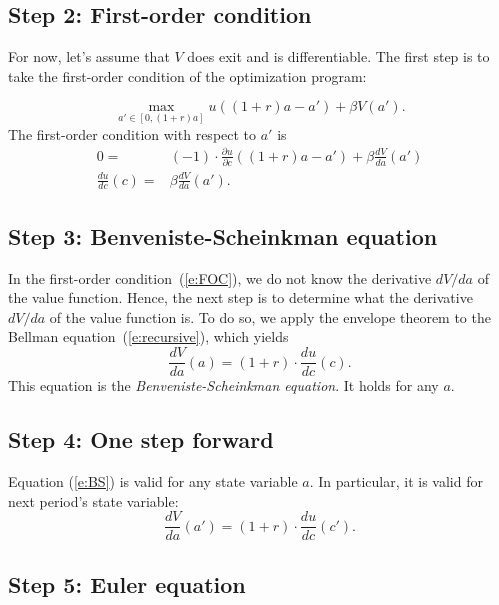 \documentclass{article}
\begin{document}
\subsection{Step 2: First-order condition}

For now, let's assume that $V$ does exit and is differentiable. The first step is to take the first-order condition of the optimization program:

\[
\max_{a'\in[0,(1+r) a]} u((1+r) a-a')+\beta V(a').
\]
The first-order condition with respect to $a'$ is
\wcSpan*[id=equation-10]{}
\setcounter{tpequation}{9}\label{e:FOC}
\[
\begin{align*}
0 = &(-1)\cdot \frac{\partial u}{\partial c}((1+r) a-a')+\beta \frac{d V}{d a}(a')\\
\frac{d u}{d c}(c) =& \beta \frac{d V}{d a}(a').\tag{10}
\end{align*}
\]

\subsection{Step 3: Benveniste-Scheinkman equation}

In the first-order condition~(\ref{e:FOC}), we do not know the derivative $d V/d a$ of the value function. Hence, the next step is to determine what the derivative $d V/d a$ of the value function is. To do so, we apply the envelope theorem to the Bellman equation~(\ref{e:recursive}), which yields
\wcSpan*[id=equation-11]{}
\setcounter{tpequation}{10}\label{e:BS}
\[
\frac{d V}{d a}(a)=(1+r) \cdot \frac{d u}{d c}(c).\tag{11}
\]
This equation is the \textit{Benveniste-Scheinkman equation}. It holds for any $a$.

\subsection{Step 4: One step forward}

Equation (\ref{e:BS}) is valid for any state variable $a$. In particular, it is valid for next period's state variable:
\wcSpan*[id=equation-12]{}
\setcounter{tpequation}{11}\label{e:BS2}
\[
\frac{d V}{d a}(a')=(1+r)\cdot \frac{d u}{d c}(c').\tag{12}
\]

\subsection{Step 5: Euler equation}
\end{document}
